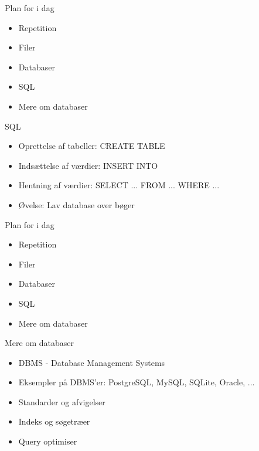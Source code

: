 \documentclass[a4paper,landscape]{slides}
\begin{document}
\begin{slide}
	\begin{center} {\large 
            Plan for i dag
	} \end{center}
	\begin{itemize} \addtolength{\itemsep}{-\baselineskip}
		\item Repetition
		\item Filer
		\item Databaser
		\item SQL
		\item Mere om databaser
	\end{itemize}
\end{slide}

\begin{slide}
	\begin{center} {\large 
            SQL
	} \end{center}
	\begin{itemize} \addtolength{\itemsep}{-\baselineskip}
		\item Oprettelse af tabeller: CREATE TABLE
		\item Indsættelse af værdier: INSERT INTO
                \item Hentning af værdier: SELECT ... FROM ... WHERE ...
                \item Øvelse: Lav database over bøger
	\end{itemize}
\end{slide}

\begin{slide}
	\begin{center} {\large 
            Plan for i dag
	} \end{center}
	\begin{itemize} \addtolength{\itemsep}{-\baselineskip}
		\item Repetition
		\item Filer
		\item Databaser
		\item SQL
		\item Mere om databaser
	\end{itemize}
\end{slide}

\begin{slide}
	\begin{center} {\large 
            Mere om databaser
	} \end{center}
	\begin{itemize} \addtolength{\itemsep}{-\baselineskip}
                \item DBMS - Database Management Systems
                \item Eksempler på DBMS'er: PostgreSQL, MySQL, SQLite, Oracle, ...
		\item Standarder og afvigelser
		\item Indeks og søgetræer
		\item Query optimiser
	\end{itemize}
\end{slide}
\end{document}
